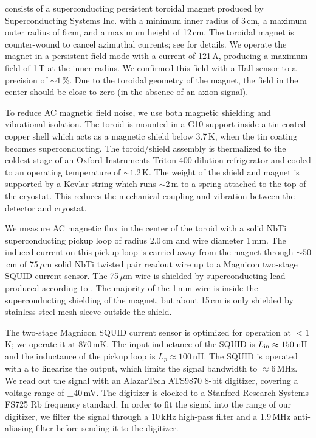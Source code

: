 \documentclass[aps,prl,amsmath,amssymb,reprint,superscriptaddress, nofootinbib,
]{revtex4-1}
\begin{document}
\abra consists of a superconducting persistent toroidal magnet produced by Superconducting Systems Inc. \cite{ssi} with a minimum inner radius of 3\,cm, a maximum outer radius of 6\,cm, and a maximum height of 12\,cm. The toroidal magnet is counter-wound to cancel azimuthal currents; see \cite{ABRA_10cm_Technical} for details. We operate the magnet in a persistent field mode with a current of 121\,A, producing a maximum field of 1\,T at the inner radius. We confirmed this field with a Hall sensor to a precision of $\sim1$\,\%. Due to the toroidal geometry of the magnet, the field in the center should be close to zero (in the absence of an axion signal). 

To reduce AC magnetic field noise, we use both magnetic shielding and vibrational isolation. The toroid is mounted in a G10 support inside a tin-coated copper shell which acts as a  magnetic shield below 3.7\,K, when the tin coating becomes superconducting. The toroid/shield assembly is thermalized to the coldest stage of an Oxford Instruments Triton 400 dilution refrigerator and cooled to an operating temperature of $\sim1.2$\,K. The weight of the shield and magnet is supported by a Kevlar string which runs $\sim$2\,m to a spring attached to the top of the cryostat. This reduces the mechanical coupling and vibration between the detector and cryostat.

We measure AC magnetic flux in the center of the toroid with a solid NbTi superconducting pickup loop of radius 2.0\,cm and wire diameter 1\,mm. The induced current on this pickup loop is carried away from the magnet through $\sim50$\,cm of 75\,$\mu$m solid NbTi twisted pair readout wire up to a Magnicon two-stage SQUID current sensor. 
The 75\,$\mu$m wire is shielded by superconducting lead produced according to \cite{Solder-Paper}. The majority of the 1\,mm wire is inside the superconducting shielding of the magnet, but about 15\,cm is only shielded by stainless steel mesh sleeve outside the shield. 

The two-stage Magnicon SQUID current sensor is optimized for operation at $<1$\,K; we operate it at $870$\,mK. The input inductance of the SQUID is $L_{\rm in}\approx150$\,nH and the inductance of the pickup loop is $L_p\approx100$\,nH. The SQUID is operated with a \FLL to linearize the output, which limits the signal bandwidth to $\approx 6$\,MHz. We read out the signal with an AlazarTech ATS9870 8-bit digitizer, covering a voltage range of $\pm40$\,mV. The digitizer is clocked to a Stanford Research Systems FS725 Rb frequency standard. In order to fit the signal into the range of our digitizer, we filter the signal through a 10\,kHz high-pass filter and a 1.9\,MHz anti-aliasing filter before sending it to the digitizer.
\end{document}
